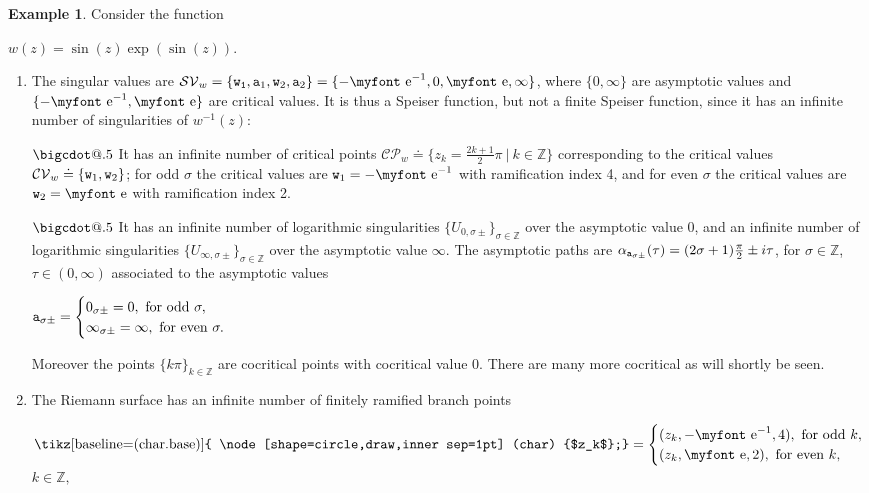 \documentclass[final,3p,times]{elsarticle}
\makeatletter
\newcommand{\ZZ}{\ensuremath{{\mathbb Z}}}
\newcommand{\e}{{\text{\myfont e}}}
\newcommand{\circled}[1]{ \text{\tikz[baseline=(char.base)]{
    \node[shape=circle,draw,inner sep=1pt] (char) {$#1$};}} }
\newcommand*\bigcdot{\mathpalette\bigcdot@{.5}}
\newcommand*\bigcdot@[2]{\mathbin{\vcenter{\hbox{\scalebox{#2}{$\m@th#1\bullet$}}}}}
\theoremstyle{definition}
\newtheorem{example}{Example}[section]
\makeatother
\begin{document}
\begin{example}
\label{example:sinexpsin}
Consider the function 

\centerline{$w(z)= \sin (z) \exp (\sin (z))$.}



\begin{enumerate}[label=\alph*),leftmargin=*]
\item
The singular values are 
$\mathcal{SV}_w=\{ {\tt w_1}, {\tt a}_1, {\tt w}_2, {\tt a}_2 \} = \{ -\e^{-1}, 0, \e, \infty \}$,
where $\{ 0, \infty \}$ are asymptotic values and $\{ -\e^{-1}, \e \}$ are critical values.
It is thus a Speiser function, but not a finite Speiser function,
since it has an infinite number 
of singularities of $w^{-1}(z)$:

\noindent
$\bigcdot$
It has an infinite number of critical points
$\mathcal{CP}_w \doteq \{z_k = \frac{2k+1}{2}\pi \ \vert \ k\in\ZZ\}$ 
corresponding to the critical values $\mathcal{CV}_w \doteq \{ {\tt w}_1, {\tt w}_2 \}$;
for odd $\sigma$ the critical values are ${\tt w}_1=-\e^{-1}$ with ramification index 4, 
and for even $\sigma$ the critical values are ${\tt w}_2=\e$ with ramification index 2.

\noindent
$\bigcdot$
It has an infinite number of logarithmic singularities 
$\{ U_{0, \sigma \pm} \}_{\sigma \in \ZZ}$ over the asymptotic value $0$, and
an infinite number of logarithmic singularities 
$\{ U_{\infty, \sigma \pm} \}_{\sigma \in \ZZ}$ over the asymptotic value $\infty$.
The asymptotic paths are 
$\alpha_{{\tt a}_{\sigma \pm}}( \tau )=(2\sigma+1)\frac{\pi}{2} \pm i \tau $, 
for $\sigma\in\ZZ$, $\tau\in (0,\infty)$ associated to the asymptotic values

\centerline{
${\tt a}_{\sigma\pm}=\begin{cases}
  0_{\sigma\pm}=0, \text{ for odd }\sigma,\\
  \infty_{\sigma\pm}=\infty, \text{ for even }\sigma.
\end{cases}$
}

\noindent
Moreover the points $\{ k \pi \}_{k\in\ZZ}$ are cocritical points with cocritical value 0. 
There are many more cocritical as will shortly be seen.

\item
The Riemann surface has an infinite number of finitely ramified branch points

\centerline{
$\circled{z_k}= \begin{cases} (z_k, -\e^{-1}, 4), \text{ for odd } k,\\
(z_k, \e, 2), \text{ for even } k, \end{cases}$ $k\in \ZZ,$
}


\end{enumerate}
\end{example}
\end{document}

